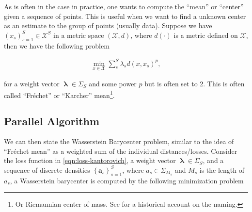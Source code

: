 

As is often in the case in practice, one wants to compute the ``mean'' or ``center'' given a sequence of points.
This is useful when we want to find a unknown center as an estimate to the group of points (usually data).
Suppose we have $\left(x_s\right)_{s = 1}^S \in \mathcal{X}^S$ in a metric space $\left(\mathcal{X}, d\right)$,
where $d(\cdot)$ is a metric defined on $\mathcal{X}$,
then we have the following problem

\begin{equation*}
  \begin{aligned}
    \min_{x \in \mathcal{X}} \sum_s^S \lambda_s d(x, x_s)^p,
  \end{aligned}
\end{equation*}

for a weight vector $\boldsymbol{\uplambda} \in \Sigma_S$ and some power $p$ but is often set to 2.
This is often called ``Fr\'echet'' or ``Karcher'' mean\footnote{
  Or Riemannian center of mass.
  See \citet{karcher2014} for a historical account on the naming.
}.



















\subsection{Parallel Algorithm}\label{subsec:barycenter-parallel}

We can then state the Wasserstein Barycenter problem, similar to the idea of ``Fr\'echet mean''
as a weighted sum of the individual distances/losses.
Consider the loss function in \cref{eqn:loss-kantorovich},
a weight vector $\boldsymbol{\uplambda} \in \Sigma_S$,
and a sequence of discrete densities $\left\{\mathbf{a}_s\right\}_{s = 1}^S$,
where $a_s \in \Sigma_{M_s}$ and $M_s$ is the length of $a_s$,
a Wasserstein barycenter is computed by the following minimization problem

